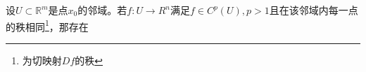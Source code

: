 
\begin{theorem}{}
设$U\subset \mathbb R^m$是点$x_0$的邻域。若$f:U\rightarrow R^n$满足$f\in C^p(U),p>1$且在该邻域内每一点的秩相同\footnote{为切映射$Df$的秩}，那存在

\end{theorem}
